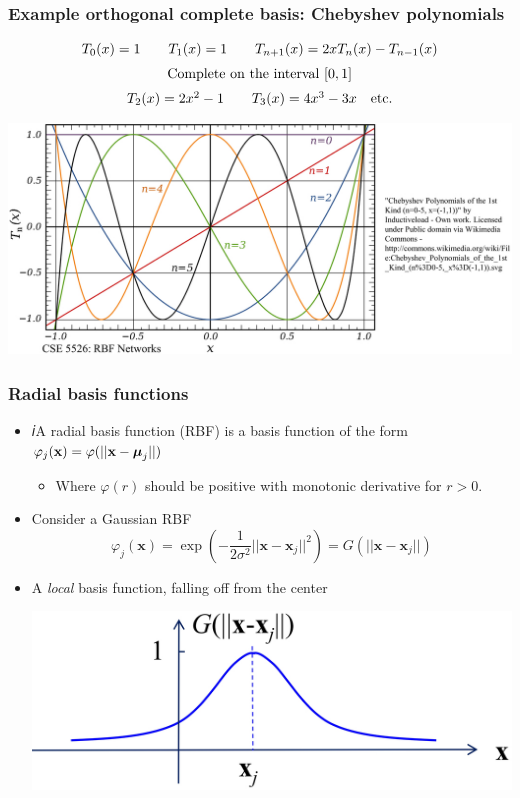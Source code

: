 \documentclass[12pt,notes,mathserif]{beamer}
\begin{document}
\begin{frame}[c]
	\frametitle{Example orthogonal complete basis: Chebyshev polynomials}
	\begin{equation*}
		\begin{array}{c}
			T_0(x)=1\qquad
			T_1(x)=1\qquad
			T_{n+1}(x)=2xT_n(x)-T_{n-1}(x)       \\[2mm]
			{\rm Complete~on~the~interval}~[0,1] \\[2mm]
			T_2(x)=2x^2-1\qquad
			T_3(x)=4x^3-3x\quad {\rm etc.}
		\end{array}
	\end{equation*}
	\begin{center}
		\includegraphics[width=0.85\linewidth]{fig/lec79.jpg}
	\end{center}
\end{frame}

\begin{frame}[c]
	\frametitle{Radial basis functions}
	\begin{itemize}
		\item 𝑖A radial basis function (RBF) is a basis function of the form $\varphi_j(\mathbf{x})=\varphi(||\mathbf{x}-\boldsymbol{\mu}_j||)$

		      \begin{itemize}
			      \item Where $\varphi(r)$ should be positive with monotonic derivative for $r> 0$. 
		      \end{itemize}
		\item Consider a Gaussian RBF
		      \[
			      \varphi_j(\mathbf{x})=\exp\left(-\dfrac{1}{2\sigma^2}||\mathbf{x}-\mathbf{x}_j||^2\right)=G(||\mathbf{x}-\mathbf{x}_j||)
		      \]
		\item A \textit{local} basis function, falling off from the center
		      \begin{center}
			      \includegraphics[width=0.85\linewidth]{fig/lec710.jpg}
		      \end{center}
	\end{itemize}
\end{frame}
\end{document}
